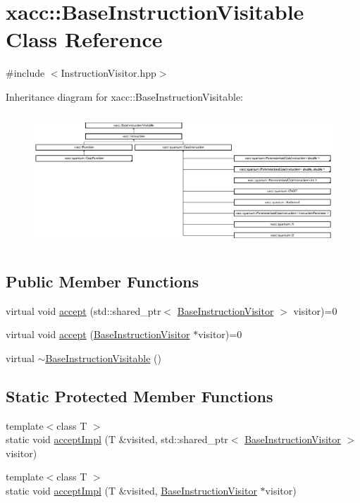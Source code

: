 \hypertarget{a02476}{}\section{xacc\+:\+:Base\+Instruction\+Visitable Class Reference}
\label{a02476}


{\ttfamily \#include $<$Instruction\+Visitor.\+hpp$>$}

Inheritance diagram for xacc\+:\+:Base\+Instruction\+Visitable\+:\begin{figure}[H]
\begin{center}
\leavevmode
\includegraphics[height=5.008130cm]{a02476}
\end{center}
\end{figure}
\subsection*{Public Member Functions}
\begin{DoxyCompactItemize}
\item 
virtual void \hyperlink{a02476_a4ae295a7f83d57c6f1f912adc90274ea}{accept} (std\+::shared\+\_\+ptr$<$ \hyperlink{a02468}{Base\+Instruction\+Visitor} $>$ visitor)=0
\item 
virtual void \hyperlink{a02476_ad6b9ad95c14580cc86ca87cd464262c3}{accept} (\hyperlink{a02468}{Base\+Instruction\+Visitor} $\ast$visitor)=0
\item 
virtual \hyperlink{a02476_a3a291d247b18ea7620dd8d97dfb595f4}{$\sim$\+Base\+Instruction\+Visitable} ()
\end{DoxyCompactItemize}
\subsection*{Static Protected Member Functions}
\begin{DoxyCompactItemize}
\item 
{\footnotesize template$<$class T $>$ }\\static void \hyperlink{a02476_a2f18b9fcb48f42d190a9f5180b7b59c5}{accept\+Impl} (T \&visited, std\+::shared\+\_\+ptr$<$ \hyperlink{a02468}{Base\+Instruction\+Visitor} $>$ visitor)
\item 
{\footnotesize template$<$class T $>$ }\\static void \hyperlink{a02476_a80c7bb995faa54644f822fa48176c6cb}{accept\+Impl} (T \&visited, \hyperlink{a02468}{Base\+Instruction\+Visitor} $\ast$visitor)
\end{DoxyCompactItemize}


